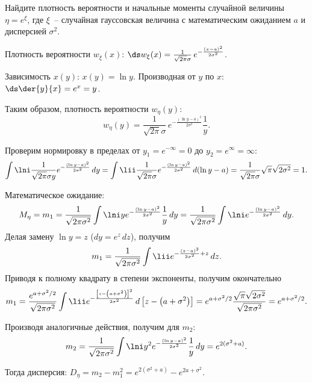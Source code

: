 \documentclass[pscyr]{hedwork}
\begin{document}
  \begin{task}{16}{
    Найдите плотность вероятности и начальные моменты случайной величины
    \( \eta = e^\xi \), где \( \xi \)~-- случайная гауссовская величина с
    математическим ожиданием \( a \) и дисперсией \( \sigma^2 \).
  }
  
    Плотность вероятности \( w_\xi(x) \):
    \( \ds
      w_\xi(x) = \frac{1}{\sqrt{2\pi}\sigma}\,e^{-\frac{(x - a)^2}{2\sigma^2}}
    \).
    
    Зависимость \( x(y) \): \( x(y) = \ln y \). Производная от \( y \) по
    \( x \): \( \ds \der{y}{x} = e^x = y \).
    
    Таким образом, плотность вероятности \( w_\eta(y) \):
    \[
      w_\eta(y) = \frac{1}{\sqrt{2\pi}\sigma}\,
        e^{-\frac{(\ln y - a)^2}{2\sigma^2}} \frac{1}{y}.
    \]
    
    Проверим нормировку в пределах от \( y_1 = e^{-\infty} = 0 \) до
    \( y_2 = e^\infty = \infty \):
    \[
      \int\lni \frac{1}{\sqrt{2\pi}\sigma y}
        e^{-\frac{(\ln y - a)^2}{2\sigma^2}}\,dy =
        \int\lii \frac{1}{\sqrt{2\pi}\sigma}
        e^{-\frac{(\ln y - a)^2}{2\sigma^2}}\,d(\ln y - a) =
        \frac{1}{\sqrt{2\pi}\sigma} \sqrt{\pi}\sqrt{2\sigma^2} = 1.
    \]
    
    Математическое ожидание:
    \[
      M_\eta = m_1 = \frac{1}{\sqrt{2\pi\sigma^2}} \int\lni y
        e^{-\frac{(\ln y - a)^2}{2\sigma^2}}\frac{1}{y}\,dy =
        \frac{1}{\sqrt{2\pi\sigma^2}}
        \int\lni e^{-\frac{(\ln y - a)^2}{2\sigma^2}}\,dy.
    \]
    Делая замену \( \ln y = z \) (\( dy = e^z\,dz \)), получим
    \[
      m_1 = \frac{1}{\sqrt{2\pi\sigma^2}}
        \int\lii e^{-\frac{(z - a)^2}{2\sigma^2} + z}\,dz.
    \]
    Приводя к полному квадрату в степени экспоненты, получим окончательно
    \[
      m_1 = \frac{e^{a + \sigma^2 / 2}}{\sqrt{2\pi\sigma^2}}
        \int\lii e^{-\frac{\left[z - \left(a + \sigma^2\right)\right]^2}
        {2\sigma^2}}\,d\left[z - \left(a + \sigma^2\right)\right] =
        e^{a + \sigma^2 / 2}
        \frac{\sqrt{\pi}\sqrt{2\sigma^2}}{\sqrt{2\pi\sigma^2}} =
        e^{a + \sigma^2 / 2}.
    \]
    
    Производя аналогичные действия, получим для \( m_2 \):
    \[
      m_2 = \frac{1}{\sqrt{2\pi\sigma^2}}
        \int\lni y^2 e^{-\frac{(\ln y - a)^2}{2\sigma^2}}\frac{1}{y}\,dy =
        e^{2(\sigma^2 + a)}.
    \]
    
    Тогда дисперсия: \( D_\eta = m_2 - m_1^2 = e^{2(\sigma^2 + a)} -
    e^{2a + \sigma^2} \).
  
  \end{task}
  
\end{document}
